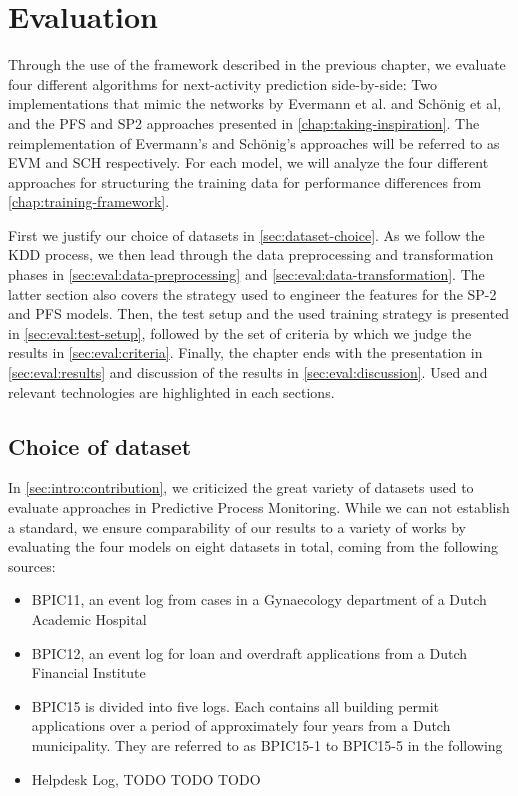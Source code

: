 \chapter{Evaluation}\label{chap:evaluation}
Through the use of the framework described in the previous chapter, we evaluate four different algorithms for next-activity prediction side-by-side: Two implementations that mimic the networks by Evermann et al. and Schönig et al, and the PFS and SP2 approaches presented in \autoref{chap:taking-inspiration}. The reimplementation of Evermann's and Schönig's approaches will be referred to as EVM and SCH respectively. For each model, we will analyze the four different approaches for structuring the training data for performance differences from \autoref{chap:training-framework}.

First we justify our choice of datasets in \autoref{sec:dataset-choice}. As we follow the KDD process, we then lead through the data preprocessing and transformation phases in \autoref{sec:eval:data-preprocessing} and \autoref{sec:eval:data-transformation}. The latter section also covers the strategy used to engineer the features for the SP-2 and PFS models. Then, the test setup and the used training strategy is presented in \autoref{sec:eval:test-setup}, followed by the set of criteria by which we judge the results in \autoref{sec:eval:criteria}. Finally, the chapter ends with the presentation in \autoref{sec:eval:results} and discussion of the results in \autoref{sec:eval:discussion}. Used and relevant technologies are highlighted in each sections.

\section{Choice of dataset}
\label{sec:dataset-choice}
In \autoref{sec:intro:contribution}, we criticized the great variety of datasets used to evaluate approaches in Predictive Process Monitoring. While we can not establish a standard, we ensure comparability of our results to a variety of works by evaluating the four models on eight datasets in total, coming from the following sources:

\begin{itemize}
    \item BPIC11, an event log from cases in a Gynaecology department of a Dutch Academic Hospital~\cite{BPIC2011}
    \item BPIC12, an event log for loan and overdraft applications from a Dutch Financial Institute~\cite{BPIC2012}
    \item BPIC15 is divided into five logs. Each contains all building permit applications over a period of approximately four years from a Dutch municipality. They are referred to as BPIC15-1 to BPIC15-5 in the following~\cite{BPIC2015}
    \item Helpdesk Log, TODO TODO TODO
\end{itemize}

